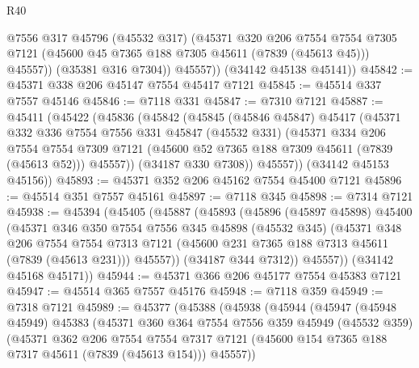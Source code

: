 \begin{lexlean}{R40}
\begin{coremodule}
              @7556
              @317
              @45796
              (@45532 @317)
              (@45371
                @320
                @206
                @7554
                @7554
                @7305
                @7121
                (@45600 @45 @7365 @188 @7305 @45611 (@7839 (@45613 @45)))
                @45557))
            (@35381 @316 @7304))
          @45557))
      (@34142 @45138 @45141))
@45842 := @45371 @338 @206 @45147 @7554 @45417 @7121
@45845 := @45514 @337 @7557 @45146
@45846 := @7118 @331
@45847 := @7310 @7121
@45887 := @45411
    (@45422
      (@45836
        (@45842
          (@45845
            (@45846 @45847)
            @45417
            (@45371
              @332
              @336
              @7554
              @7556
              @331
              @45847
              (@45532 @331)
              (@45371
                @334
                @206
                @7554
                @7554
                @7309
                @7121
                (@45600 @52 @7365 @188 @7309 @45611 (@7839 (@45613 @52)))
                @45557))
            (@34187 @330 @7308))
          @45557))
      (@34142 @45153 @45156))
@45893 := @45371 @352 @206 @45162 @7554 @45400 @7121
@45896 := @45514 @351 @7557 @45161
@45897 := @7118 @345
@45898 := @7314 @7121
@45938 := @45394
    (@45405
      (@45887
        (@45893
          (@45896
            (@45897 @45898)
            @45400
            (@45371
              @346
              @350
              @7554
              @7556
              @345
              @45898
              (@45532 @345)
              (@45371
                @348
                @206
                @7554
                @7554
                @7313
                @7121
                (@45600 @231 @7365 @188 @7313 @45611 (@7839 (@45613 @231)))
                @45557))
            (@34187 @344 @7312))
          @45557))
      (@34142 @45168 @45171))
@45944 := @45371 @366 @206 @45177 @7554 @45383 @7121
@45947 := @45514 @365 @7557 @45176
@45948 := @7118 @359
@45949 := @7318 @7121
@45989 := @45377
    (@45388
      (@45938
        (@45944
          (@45947
            (@45948 @45949)
            @45383
            (@45371
              @360
              @364
              @7554
              @7556
              @359
              @45949
              (@45532 @359)
              (@45371
                @362
                @206
                @7554
                @7554
                @7317
                @7121
                (@45600 @154 @7365 @188 @7317 @45611 (@7839 (@45613 @154)))
                @45557))

\end{coremodule}
\end{lexlean}
